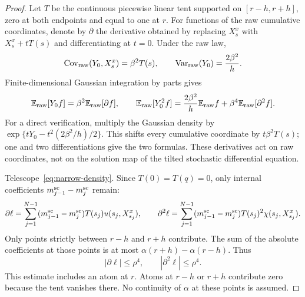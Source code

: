 \begin{proof}
Let $T$ be the continuous piecewise linear tent supported on
$[r-h,r+h]$, zero at both endpoints and equal to one at $r$.
For functions of the raw cumulative coordinates, denote by
$\partial$ the derivative obtained by replacing $X^x_s$ with
$X^x_s+tT(s)$ and differentiating at $t=0$. Under the raw law,
\[
 {\rm Cov}_{\rm raw}(Y_0,X^x_s)=\beta^2T(s),\qquad
 {\rm Var}_{\rm raw}(Y_0)=\frac{2\beta^2}{h}.
\]
Finite-dimensional Gaussian integration by parts gives
\begin{equation}\label{eq:narrow-tent-ibp}
 \mathbb E_{\rm raw}[Y_0f]=\beta^2\mathbb E_{\rm raw}[\partial f],\qquad
 \mathbb E_{\rm raw}[Y_0^2f]
 =\frac{2\beta^2}{h}\mathbb E_{\rm raw}f
      +\beta^4\mathbb E_{\rm raw}[\partial^2f].
\end{equation}
For a direct verification, multiply the Gaussian density by
$\exp\{tY_0-t^2(2\beta^2/h)/2\}$. This shifts every cumulative
coordinate by $t\beta^2T(s)$; one and two differentiations give
the two formulas. These derivatives act on raw coordinates, not
on the solution map of the tilted stochastic differential equation.

Telescope~\eqref{eq:narrow-density}. Since $T(0)=T(q)=0$,
only internal coefficients $m_{j-1}^{\rm sc}-m_j^{\rm sc}$ remain:
\[
 \partial\ell
 =\sum_{j=1}^{N-1}(m_{j-1}^{\rm sc}-m_j^{\rm sc})
          T(s_j)u(s_j,X^x_{s_j}),\qquad
 \partial^2\ell
 =\sum_{j=1}^{N-1}(m_{j-1}^{\rm sc}-m_j^{\rm sc})
          T(s_j)^2\chi(s_j,X^x_{s_j}).
\]
Only points strictly between $r-h$ and $r+h$ contribute. The sum
of the absolute coefficients at those points is at most
$\alpha(r+h)-\alpha(r-h)$. Thus
\begin{equation}\label{eq:narrow-density-derivatives}
 |\partial\ell|\le\rho^4,\qquad
 |\partial^2\ell|\le\rho^4.
\end{equation}
This estimate includes an atom at $r$. Atoms at $r-h$ or $r+h$
contribute zero because the tent vanishes there. No continuity of
$\alpha$ at these points is assumed.


\end{proof}
